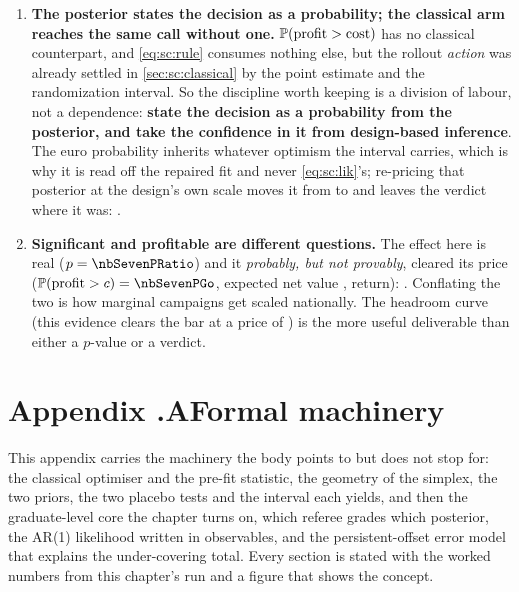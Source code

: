 \begin{enumerate}[leftmargin=*, itemsep=.45em]
  \item \textbf{The posterior states the decision as a probability; the classical arm reaches the
        same call without one.} $\operatorname{\mathbb{P}}(\text{profit} > \text{cost})$ has no classical counterpart, and
        \cref{eq:sc:rule} consumes nothing else, but the rollout \emph{action} was already settled in
        \cref{sec:sc:classical} by the point estimate and the randomization interval. So the
        discipline worth keeping is a division
        of labour, not a dependence: \textbf{state the decision as a probability from the posterior,
        and take the confidence in it from design-based inference}. The euro probability inherits
        whatever optimism the interval carries, which is why it is read off the repaired fit and never
        \cref{eq:sc:lik}'s; re-pricing that posterior at the design's own scale moves it from
        \nbSevenPGo{} to \nbSevenPGoRescaled{} and leaves the verdict where it was:
        \nbSevenDecisionRescaled{}.

  \item \textbf{Significant and profitable are different questions.} The effect here is real
        ($p = \nbSevenPRatio$) and it \emph{probably, but not provably}, cleared its price
        ($\Prob(\text{profit} > c) = \nbSevenPGo$, expected net value \keur{\nbSevenExpNet},
        \pc{\nbSevenExpRoi} return): \nbSevenDecision{}.
        Conflating the two is how marginal campaigns get scaled nationally. The headroom curve
        (this evidence clears the bar at a price of \keur{\nbSevenHeadroom}) is the more useful
        deliverable than either a $p$-value or a verdict.
\end{enumerate}

\clearpage
{}
\section*{Appendix \thechapter.A\quad Formal machinery}
\label{app:sc:formal}

This appendix carries the machinery the body points to but does not stop for: the classical optimiser
and the pre-fit statistic, the geometry of the simplex, the two priors, the two placebo tests and the
interval each yields, and then the graduate-level core the chapter turns on, which referee grades
which posterior, the AR(1) likelihood written in observables, and the persistent-offset error model
that explains the under-covering total. Every section is stated with the worked numbers from this
chapter's run and a figure that shows the concept.


